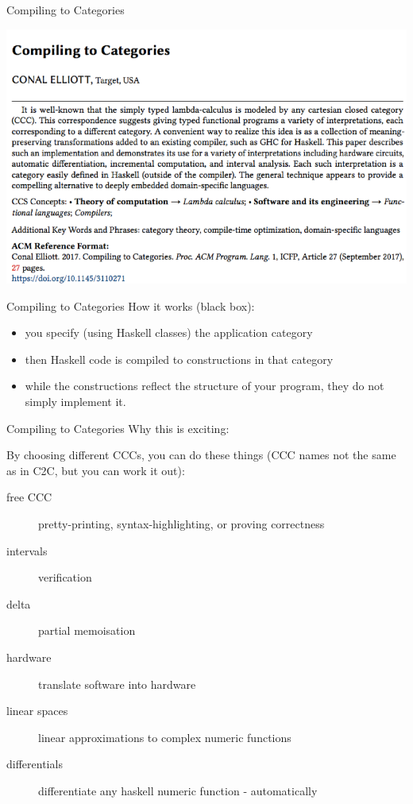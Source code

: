 \documentclass[10pt]{beamer}
\theoremstyle{definition}
\theoremstyle{remark}
\numberwithin{equation}{section}
\begin{document}
\begin{frame}[fragile]{Compiling to Categories}
  \begin{center}
    \includegraphics[width=1.0\textwidth]{compiling-to-categories-headpic.png}
  \end{center}
\end{frame}

\begin{frame}[fragile]{Compiling to Categories}
  How it works (black box):
  \begin{itemize}
    \item you specify (using Haskell classes) the application category
    \item then Haskell code is compiled to constructions in that category
    \item while the constructions reflect the structure of your program, they do not simply implement it.
  \end{itemize}
\end{frame}

\begin{frame}[fragile]{Compiling to Categories}
  Why this is exciting:
  
  By choosing different CCCs, you can do these things (CCC names not the same as in C2C, but you can work it out):
  \begin{description}
  \item[free CCC] pretty-printing, syntax-highlighting, or proving correctness
  \item[intervals] verification
  \item[delta] partial memoisation
  \item[hardware] translate software into hardware
  \item[linear spaces] linear approximations to complex numeric functions
  \item[differentials] differentiate any haskell numeric function - automatically
  \end{description}
\end{frame}
\end{document}

